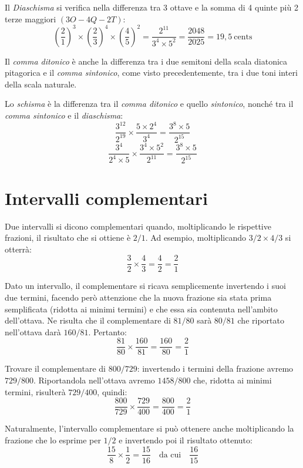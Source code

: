 Il \emph{Diaschisma} si verifica nella differenza tra 3 ottave e la somma di 4
quinte più 2 terze maggiori $(3O - 4Q - 2T)$:
\[
  \left(\frac{2}{1}\right)^{3} \times \left(\frac{2}{3}\right)^{4} \times
  \left(\frac{4}{5}\right)^{2} = \frac{2^{11}}{3^{4} \times 5^{2}}
  = \frac{2048}{2025} = 19{,}5~\text{cents}
\]

Il \emph{comma ditonico} è anche la differenza tra i due semitoni della scala
diatonica pitagorica e il \emph{comma sintonico}, come visto precedentemente,
tra i due toni interi della scala naturale.

Lo \emph{schisma} è la differenza tra il \emph{comma ditonico} e quello
\emph{sintonico}, nonché tra il \emph{comma sintonico} e il \emph{diaschisma}:
\[
  \frac{3^{12}}{2^{19}} \times \frac{5 \times 2^{4}}{3^{4}}
  = \frac{3^{8} \times 5}{2^{15}}
\]
\[
  \frac{3^{4}}{2^{4} \times 5} \times \frac{3^{4} \times 5^{2}}{2^{11}}
  = \frac{3^{8} \times 5}{2^{15}}
\]

\section{Intervalli complementari}

Due intervalli si dicono complementari quando, moltiplicando le rispettive
frazioni, il risultato che si ottiene è $2/1$. Ad esempio, moltiplicando
$3/2 \times 4/3$ si otterrà:
\[
  \frac{3}{2} \times \frac{4}{3} = \frac{4}{2} = \frac{2}{1}
\]

Dato un intervallo, il complementare si ricava semplicemente invertendo i suoi
due termini, facendo però attenzione che la nuova frazione sia stata prima
semplificata (ridotta ai minimi termini) e che essa sia contenuta nell'ambito
dell'ottava. Ne risulta che il complementare di $81/80$ sarà $80/81$ che
riportato nell'ottava darà $160/81$. Pertanto:
\[
  \frac{81}{80} \times \frac{160}{81} = \frac{160}{80} = \frac{2}{1}
\]

Trovare il complementare di $800/729$: invertendo i termini della frazione
avremo $729/800$. Riportandola nell'ottava avremo $1458/800$ che, ridotta ai
minimi termini, risulterà $729/400$, quindi:
\[
  \frac{800}{729} \times \frac{729}{400} = \frac{800}{400} = \frac{2}{1}
\]

Naturalmente, l'intervallo complementare si può ottenere anche moltiplicando la
frazione che lo esprime per $1/2$ e invertendo poi il risultato ottenuto:
\[
  \frac{15}{8} \times \frac{1}{2} = \frac{15}{16} \quad\text{da cui}\quad
  \frac{16}{15}
\]

